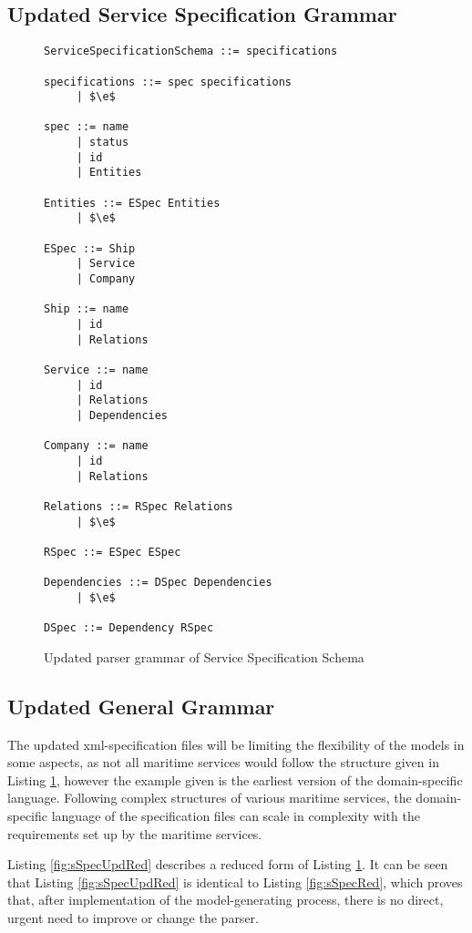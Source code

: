 \subsection{Updated Service Specification Grammar}

\begin{figure}
	\centering
	\begin{lstlisting}[keywordstyle={}]
ServiceSpecificationSchema ::= specifications

specifications ::= spec specifications
     | $\e$
     
spec ::= name
     | status
     | id
     | Entities

Entities ::= ESpec Entities
     | $\e$

ESpec ::= Ship
     | Service
     | Company

Ship ::= name
     | id
     | Relations

Service ::= name
     | id
     | Relations
     | Dependencies

Company ::= name
     | id
     | Relations

Relations ::= RSpec Relations
     | $\e$

RSpec ::= ESpec ESpec

Dependencies ::= DSpec Dependencies
     | $\e$

DSpec ::= Dependency RSpec
	\end{lstlisting}
	\caption{Updated parser grammar of Service Specification Schema}
	\label{fig:sSpecUpd}
\end{figure}
\subsection{Updated General Grammar}
The updated xml-specification files will be limiting the flexibility of the models in some aspects, as not all maritime services would follow the structure given in Listing \ref{fig:sSpecUpd}, however the example given is the earliest version of the domain-specific language. Following complex structures of various maritime services, the domain-specific language of the specification files can scale in complexity with the requirements set up by the maritime services.

Listing \ref{fig:sSpecUpdRed} describes a reduced form of Listing \ref{fig:sSpecUpd}. It can be seen that Listing \ref{fig:sSpecUpdRed} is identical to Listing \ref{fig:sSpecRed}, which proves that, after implementation of the model-generating process, there is no direct, urgent need to improve or change the parser.

